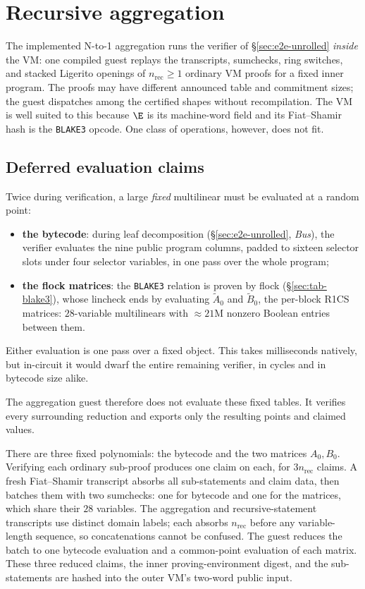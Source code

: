 \section{Recursive aggregation}\label{sec:recursion}

The implemented N-to-1 aggregation runs the verifier of \S\ref{sec:e2e-unrolled} \emph{inside} the VM: one compiled guest replays the transcripts, sumchecks, ring switches, and stacked Ligerito openings of $n_{\mathrm{rec}}\ge1$ ordinary VM proofs for a fixed inner program. The proofs may have different announced table and commitment sizes; the guest dispatches among the certified shapes without recompilation. The VM is well suited to this because $\E$ is its machine-word field and its Fiat--Shamir hash is the \texttt{BLAKE3} opcode. One class of operations, however, does not fit.

\subsection{Deferred evaluation claims}\label{sec:deferred-claims}

Twice during verification, a large \emph{fixed} multilinear must be evaluated at a random point:
\begin{itemize}
\item \textbf{the bytecode}: during leaf decomposition (\S\ref{sec:e2e-unrolled}, \emph{Bus}), the verifier evaluates the nine public program columns, padded to sixteen selector slots under four selector variables, in one pass over the whole program;
\item \textbf{the flock matrices}: the \texttt{BLAKE3} relation is proven by flock (\S\ref{sec:tab-blake3}), whose lincheck ends by evaluating $\widetilde A_0$ and $\widetilde B_0$, the per-block R1CS matrices: $28$-variable multilinears with $\approx 21\mathrm{M}$ nonzero Boolean entries between them.
\end{itemize}
Either evaluation is one pass over a fixed object. This takes milliseconds natively, but in-circuit it would dwarf the entire remaining verifier, in cycles and in bytecode size alike.

The aggregation guest therefore does not evaluate these fixed tables. It verifies every surrounding reduction and exports only the resulting points and claimed values.

There are three fixed polynomials: the bytecode and the two matrices $A_0,B_0$. Verifying each ordinary sub-proof produces one claim on each, for $3n_{\mathrm{rec}}$ claims. A fresh Fiat--Shamir transcript absorbs all sub-statements and claim data, then batches them with two sumchecks: one for bytecode and one for the matrices, which share their $28$ variables. The aggregation and recursive-statement transcripts use distinct domain labels; each absorbs $n_{\mathrm{rec}}$ before any variable-length sequence, so concatenations cannot be confused. The guest reduces the batch to one bytecode evaluation and a common-point evaluation of each matrix. These three reduced claims, the inner proving-environment digest, and the sub-statements are hashed into the outer VM's two-word public input.

